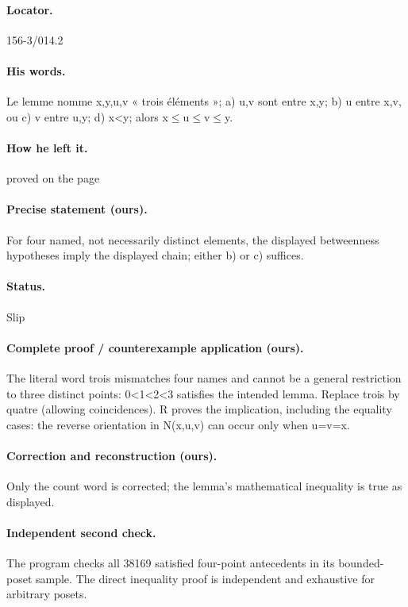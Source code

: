 \paragraph{Locator.} 156-3/014.2

\paragraph{His words.} Le lemme nomme x,y,u,v « trois éléments »; a) u,v sont entre x,y; b) u entre x,v, ou c) v entre u,y; d) x<y; alors x\ensuremath{\leq}u\ensuremath{\leq}v\ensuremath{\leq}y.

\paragraph{How he left it.} proved on the page

\paragraph{Precise statement (ours).} For four named, not necessarily distinct elements, the displayed betweenness hypotheses imply the displayed chain; either b) or c) suffices.

\paragraph{Status.} Slip

\paragraph{Complete proof / counterexample application (ours).} The literal word trois mismatches four names and cannot be a general restriction to three distinct points: 0<1<2<3 satisfies the intended lemma. Replace trois by quatre (allowing coincidences). R proves the implication, including the equality cases: the reverse orientation in N(x,u,v) can occur only when u=v=x.

\paragraph{Correction and reconstruction (ours).} Only the count word is corrected; the lemma’s mathematical inequality is true as displayed.

\paragraph{Independent second check.} The program checks all 38169 satisfied four-point antecedents in its bounded-poset sample. The direct inequality proof is independent and exhaustive for arbitrary posets.

